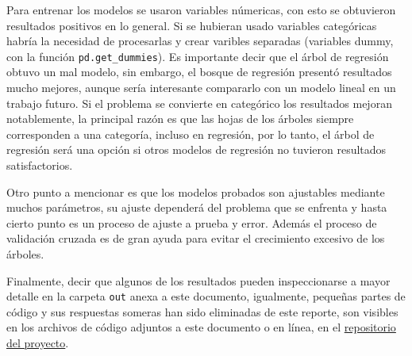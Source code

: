 \documentclass[12pt,a4paper,table]{article}
\begin{document}
Para entrenar los modelos se usaron variables númericas, con esto se
obtuvieron resultados positivos en lo general. Si se hubieran usado
variables categóricas habría la necesidad de procesarlas y crear
varibles separadas (variables dummy, con la función
\texttt{pd.get\_dummies}). Es importante decir que el árbol de regresión
obtuvo un mal modelo, sin embargo, el bosque de regresión presentó
resultados mucho mejores, aunque sería interesante compararlo con un
modelo lineal en un trabajo futuro. Si el problema se convierte en
categórico los resultados mejoran notablemente, la principal razón es
que las hojas de los árboles siempre corresponden a una categoría,
incluso en regresión, por lo tanto, el árbol de regresión será una
opción si otros modelos de regresión no tuvieron resultados
satisfactorios.

Otro punto a mencionar es que los modelos probados son ajustables
mediante muchos parámetros, su ajuste dependerá del problema que se
enfrenta y hasta cierto punto es un proceso de ajuste a prueba y error.
Además el proceso de validación cruzada es de gran ayuda para evitar el
crecimiento excesivo de los árboles.

Finalmente, decir que algunos de los resultados pueden inspeccionarse a
mayor detalle en la carpeta \texttt{out} anexa a este documento, igualmente,
pequeñas partes de código y sus respuestas someras han sido eliminadas de
este reporte, son visibles en los archivos de código adjuntos a este documento
o en línea, en el \href{https://gitlab.com/genomorro/unir/-/tree/AA-A1}{repositorio del proyecto}.


    
    
        
    
    
\end{document}
